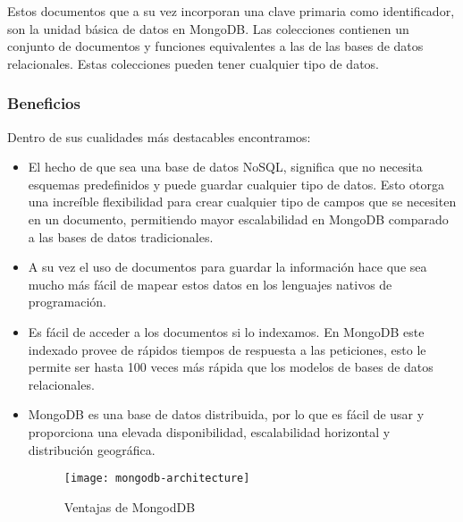 Estos documentos que a su vez incorporan una clave primaria como identificador, son la unidad básica de datos en MongoDB. Las colecciones contienen un conjunto de documentos y funciones equivalentes a las de las bases de datos relacionales. Estas colecciones pueden tener cualquier tipo de datos.


\subsubsection{ Beneficios }

Dentro de sus cualidades más destacables encontramos:

\begin{itemize}
    
    \item El hecho de que sea una base de datos NoSQL, significa que no necesita esquemas predefinidos y puede guardar cualquier tipo de datos. Esto otorga una increíble flexibilidad para crear cualquier tipo de campos que se necesiten en un documento, permitiendo mayor escalabilidad en MongoDB comparado a las bases de datos tradicionales.

    \item A su vez el uso de documentos para guardar la información hace que sea mucho más fácil de mapear estos datos en los lenguajes nativos de programación.

    \item Es fácil de acceder a los documentos si lo indexamos. En MongoDB este indexado provee de rápidos tiempos de respuesta a las peticiones, esto le permite ser hasta 100 veces más rápida que los modelos de bases de datos relacionales.

    \item MongoDB es una base de datos distribuida, por lo que es fácil de usar y proporciona una elevada disponibilidad, escalabilidad horizontal y distribución geográfica.
    
    \begin{figure}[h]
        \centering
        \texttt{[image: mongodb-architecture]}
        \caption{ Ventajas de MongodDB  }
        \label{fig:mongoDBarquitectura}
    \end{figure}

\end{itemize}

